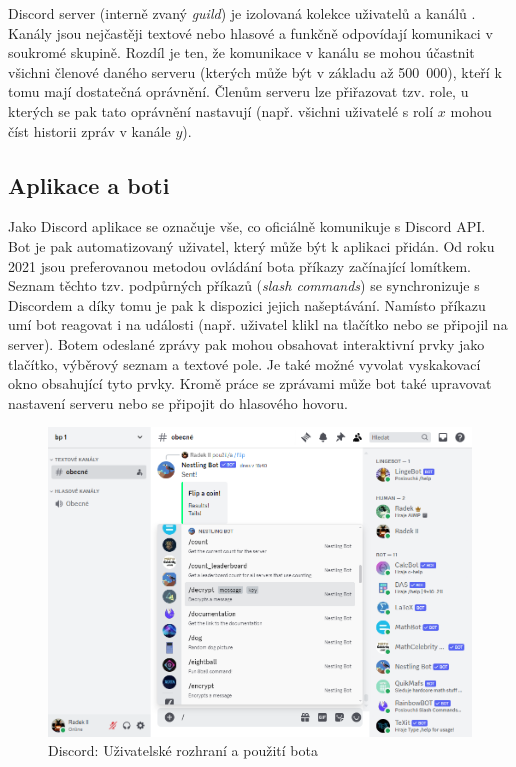 \documentclass[FM]{tulthesis}
\begin{document}
	Discord server (interně zvaný \textit{guild}) je izolovaná kolekce uživatelů a kanálů \cite{doc_Discord}. Kanály jsou nejčastěji textové nebo hlasové a funkčně odpovídají komunikaci v soukromé skupině. Rozdíl je ten, že komunikace v kanálu se mohou účastnit všichni členové daného serveru (kterých může být v základu až 500~000), kteří k tomu mají dostatečná oprávnění. Členům serveru lze přiřazovat tzv. role, u kterých se pak tato oprávnění nastavují (např. všichni uživatelé s rolí $x$ mohou číst historii zpráv v kanále $y$).
	
	\subsection{Aplikace a boti}
	
	Jako Discord aplikace se označuje vše, co oficiálně komunikuje s Discord API. Bot je pak automatizovaný uživatel, který může být k aplikaci přidán. Od roku 2021 jsou preferovanou metodou ovládání bota příkazy začínající lomítkem. Seznam těchto tzv. podpůrných příkazů (\textit{slash commands}) se synchronizuje s Discordem a díky tomu je pak k dispozici jejich našeptávání. Namísto příkazu umí bot reagovat i na události (např. uživatel klikl na tlačítko nebo se připojil na server). Botem odeslané zprávy pak mohou obsahovat interaktivní prvky jako tlačítko, výběrový seznam a textové pole. Je také možné vyvolat vyskakovací okno obsahující tyto prvky. Kromě práce se zprávami může bot také upravovat nastavení serveru nebo se připojit do hlasového hovoru. \cite{pdf_apps101}
	
	\begin{figure}[ht]
		\centering
		\includegraphics[width=\textwidth]{img/DiscordBotCommands}
		\caption{Discord: Uživatelské rozhraní a použití bota}
	\end{figure}
	
\end{document}

